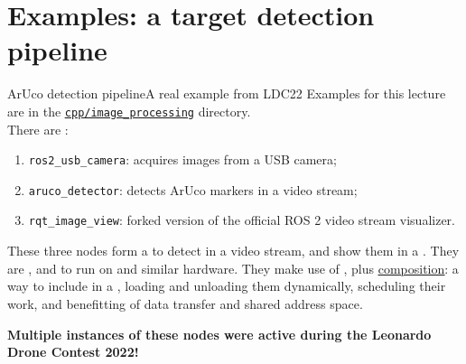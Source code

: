
\section{Examples: a target detection pipeline}
\graphicspath{{figs/section4/}}

\begin{frame}{ArUco detection pipeline}{A real example from LDC22}
  Examples for this lecture are in the \href{https://github.com/IntelligentSystemsLabUTV/ros2-examples/tree/humble/src/cpp/image_processing}{\color{blue}\underline{\texttt{cpp/image\_processing}}} directory.\\
  There are :
  \begin{enumerate}
    \item \texttt{ros2\_usb\_camera}: acquires images from a USB camera;
    \item \texttt{aruco\_detector}: detects ArUco markers in a video stream;
    \item \texttt{rqt\_image\_view}: forked version of the official ROS 2 video stream visualizer.
  \end{enumerate}
  These three nodes form a  to detect  in a video stream, and show them in a . They are , and  to run on  and similar hardware. They make use of , plus \href{https://docs.ros.org/en/humble/Concepts/About-Composition.html}{\color{blue}\underline{composition}}: a way to include  in a , loading and unloading them dynamically, scheduling their work, and benefitting of  data transfer and shared address space.
  \begin{block}{}
    \centering
    \textbf{Multiple instances of these nodes were active during the Leonardo Drone Contest 2022!}
  \end{block}
\end{frame}
